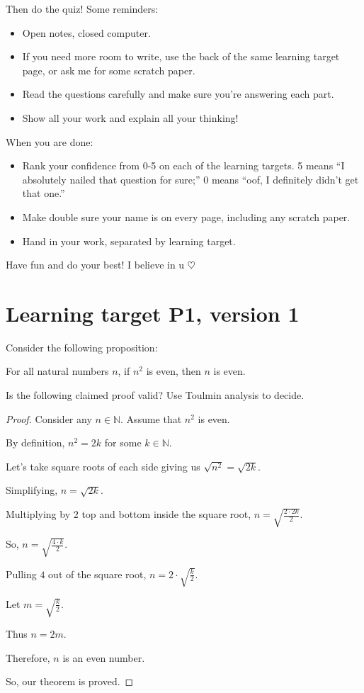 Then do the quiz! Some reminders:
\begin{itemize}
    \item Open notes, closed computer.
    \item If you need more room to write, use the back of the same learning target page, or ask me for some scratch paper.
    \item Read the questions carefully and make sure you're answering each part.
    \item Show all your work and explain all your thinking!
\end{itemize}

When you are done:
\begin{itemize}
    \item Rank your confidence from 0-5 on each of the learning targets. 5 means ``I absolutely nailed that question for sure;'' 0 means ``oof, I definitely didn't get that one.''
    \item Make double sure your name is on every page, including any scratch paper.
    \item Hand in your work, separated by learning target.
\end{itemize}

Have fun and do your best! I believe in u $\heartsuit$


\pagebreak
\section{Learning target P1, version 1}
Consider the following proposition:

For all natural numbers $n$, if $n^{2}$ is even, then $n$ is even. 

Is the following claimed proof valid? Use Toulmin analysis to decide.

\hrulefill

    \begin{proof} Consider any $n \in \mathbb{N}$. Assume that $n^{2}$ is even. 
    
    By definition, $n^{2} = 2k$ for some $k \in \mathbb{N}$.
    
    Let's take square roots of each side giving us $\sqrt{n^{2}}=\sqrt{2k}$. 
    
    Simplifying, $n=\sqrt{2k}$.  
    
    Multiplying by $2$ top and bottom inside the square root, $n=\sqrt{\frac{2\cdot 2k}{2}}$. 
    
    So, $n=\sqrt{\frac{4\cdot k}{2}}$.  
    
    Pulling $4$ out of the square root, $n=2\cdot\sqrt{\frac{k}{2}}$.
    
    Let $m=\sqrt{\frac{k}{2}}$.
    
    Thus $n=2m$.
    
    Therefore, $n$ is an even number.
    
    So, our theorem is proved.
    \end{proof}
\pagebreak
